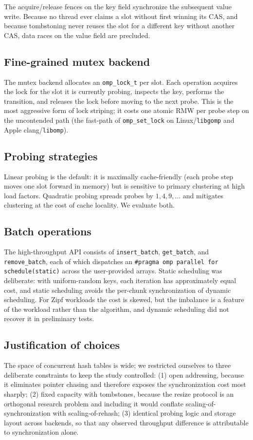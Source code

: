 \documentclass[10pt,twocolumn]{article}
\begin{document}
The acquire/release fences on the key field synchronize the
subsequent value write. Because no thread ever claims a slot without
first winning its CAS, and because tombstoning never reuses the slot
for a different key without another CAS, data races on the value
field are precluded.

\subsection{Fine-grained mutex backend}
The mutex backend allocates an \texttt{omp\_lock\_t} per slot. Each
operation acquires the lock for the slot it is currently probing,
inspects the key, performs the transition, and releases the lock
before moving to the next probe. This is the most aggressive form
of lock striping; it costs one atomic RMW per probe step on the
uncontended path (the fast-path of \texttt{omp\_set\_lock} on
Linux/\texttt{libgomp} and Apple clang/\texttt{libomp}).

\subsection{Probing strategies}
Linear probing is the default: it is maximally cache-friendly (each
probe step moves one slot forward in memory) but is sensitive to
primary clustering at high load factors. Quadratic probing spreads
probes by $1,4,9,\dots$ and mitigates clustering at the cost of
cache locality. We evaluate both.

\subsection{Batch operations}
The high-throughput API consists of \texttt{insert\_batch},
\texttt{get\_batch}, and \texttt{remove\_batch}, each of which
dispatches an \texttt{\#pragma~omp~parallel~for}
\texttt{schedule(static)} across the user-provided arrays. Static scheduling was deliberate:
with uniform-random keys, each iteration has approximately equal
cost, and static scheduling avoids the per-chunk synchronization of
dynamic scheduling. For Zipf workloads the cost is skewed, but the
imbalance is a feature of the workload rather than the algorithm,
and dynamic scheduling did not recover it in preliminary tests.

\subsection{Justification of choices}
The space of concurrent hash tables is wide; we restricted ourselves
to three deliberate constraints to keep the study controlled:
(1) open addressing, because it eliminates pointer chasing and
therefore exposes the synchronization cost most sharply;
(2) fixed capacity with tombstones, because the resize protocol is
an orthogonal research problem and including it would conflate
scaling-of-synchronization with scaling-of-rehash;
(3) identical probing logic and storage layout across backends, so
that any observed throughput difference is attributable to
synchronization alone.
\end{document}
